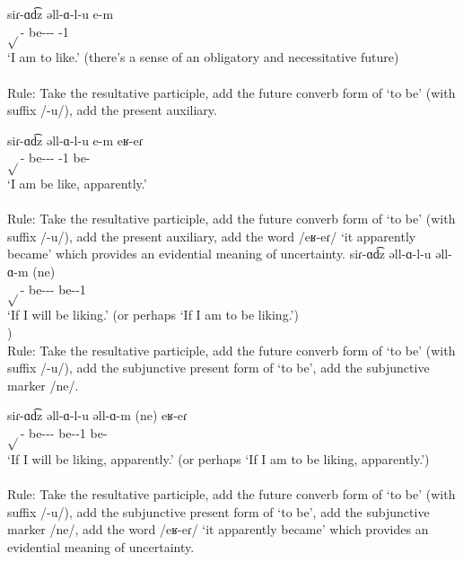\begin{exe}
\begin{xlist}
		\ex \gll siɾ-ɑd͡z əll-ɑ-l-u e-m \\
		$\sqrt{}$-{\rptcp} be-{\thgloss}-{\infgloss}-{\futcvb} {\aux}-1{\sg} \\
		\trans `I am to like.' (there's a sense of an obligatory and necessitative future) \\
		\\
		Rule: Take the resultative participle, add the future converb form of `to be' (with suffix /-u/), add the present auxiliary. 
		
		\ex \gll siɾ-ɑd͡z əll-ɑ-l-u e-m eʁ-eɾ \\
		$\sqrt{}$-{\rptcp} be-{\thgloss}-{\infgloss}-{\futcvb} {\aux}-1{\sg} be-{\eptcp} \\
		\trans `I am be like, apparently.' \\
		 \\
		Rule: Take the resultative participle, add the future converb form of `to be' (with suffix /-u/), add the present auxiliary, add the word /eʁ-eɾ/ `it apparently became' which provides an evidential meaning of uncertainty. 
		\ex \gll siɾ-ɑd͡z əll-ɑ-l-u əll-ɑ-m (ne) \\
		$\sqrt{}$-{\rptcp} be-{\thgloss}-{\infgloss}-{\futcvb} be-{\thgloss}-1{\sg} {\sbjv} \\
		\trans `If I will be liking.' (or perhaps `If I am to be liking.') \\
		) \\
		Rule: Take the resultative participle, add the future converb form of `to be' (with suffix /-u/), add the subjunctive present form of `to be', add the subjunctive marker /ne/. 
		
		\ex \gll siɾ-ɑd͡z əll-ɑ-l-u əll-ɑ-m (ne) eʁ-eɾ \\
		$\sqrt{}$-{\rptcp} be-{\thgloss}-{\infgloss}-{\futcvb} be-{\thgloss}-1{\sg} {\sbjv} be-{\eptcp} \\
		\trans `If I will be liking, apparently.' (or perhaps `If I am to be liking, apparently.')\\
		\\
		Rule: Take the resultative participle, add the future converb form of `to be' (with suffix /-u/), add the subjunctive present form of `to be', add the subjunctive marker /ne/, add the word /eʁ-eɾ/ `it apparently became' which provides an evidential meaning of uncertainty. 
		
	\end{xlist}
\end{exe}

